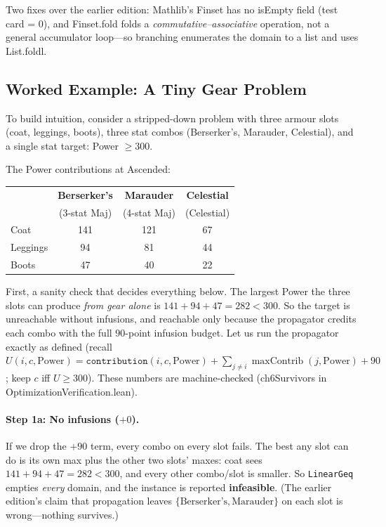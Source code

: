 \documentclass[11pt, a4paper, oneside]{book}
\newcommand{\maxContrib}{\operatorname{maxContrib}}
\newcommand{\li}[1]{{\ttfamily\small\color{deepblue}#1}}
\begin{document}
Two fixes over the earlier edition: Mathlib's \li{Finset} has no \li{isEmpty}
field (test \li{card = 0}), and \li{Finset.fold} folds a
\emph{commutative--associative} operation, not a general accumulator loop---so
branching enumerates the domain to a list and uses \li{List.foldl}.

\subsection{Worked Example: A Tiny Gear Problem}

To build intuition, consider a stripped-down problem with three armour slots
(coat, leggings, boots), three stat combos (Berserker's, Marauder, Celestial),
and a single stat target: Power $\geq 300$.

The Power contributions at Ascended:
\begin{center}
\small
\begin{tabular}{lccc}
\toprule
& \textbf{Berserker's} & \textbf{Marauder} & \textbf{Celestial} \\
& (3-stat Maj) & (4-stat Maj) & (Celestial) \\
\midrule
Coat     & 141 & 121 & 67 \\
Leggings & 94  & 81  & 44 \\
Boots    & 47  & 40  & 22 \\
\bottomrule
\end{tabular}
\end{center}

First, a sanity check that decides everything below.  The largest Power the
three slots can produce \emph{from gear alone} is $141 + 94 + 47 = 282 < 300$.
So the target is unreachable without infusions, and reachable only because the
propagator credits each combo with the full $90$-point infusion budget.  Let us
run the propagator exactly as defined (recall $U(i,c,\text{Power}) =
\texttt{contribution}(i,c,\text{Power}) + \sum_{j\neq i}\maxContrib(j,\text{Power})
+ 90$; keep $c$ iff $U \geq 300$).  These numbers are machine-checked
(\li{ch6Survivors} in \li{OptimizationVerification.lean}).

\paragraph{Step 1a: No infusions ($+0$).}
If we drop the $+90$ term, every combo on every slot fails.  The best any slot
can do is its own max plus the other two slots' maxes: coat sees
$141 + 94 + 47 = 282 < 300$, and every other combo/slot is smaller.  So
\texttt{LinearGeq} empties \emph{every} domain, and the instance is reported
\textbf{infeasible}.  (The earlier edition's claim that propagation leaves
$\{\text{Berserker's}, \text{Marauder}\}$ on each slot is wrong---nothing
survives.)
\end{document}
